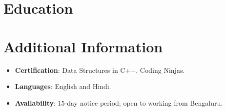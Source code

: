 \documentclass[11pt,a4paper,sans]{moderncv}
\begin{document}
\section{Education}
\vspace{1pt}


\section{Additional Information}
\vspace{1pt}
\begin{itemize}
\item {\textbf{Certification}: Data Structures in C++, Coding Ninjas.}
\item {\textbf{Languages}: English and Hindi.}
\item {\textbf{Availability}: 15-day notice period; open to working from Bengaluru.}
\end{itemize}
\end{document}
